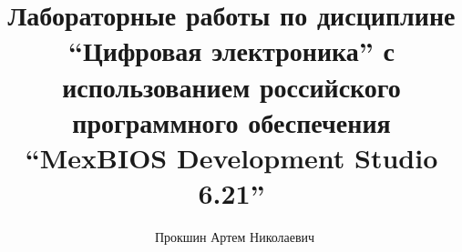 \newcommand{\itemi}{\item[\checkmark]}


\title{\small{ Лабораторные работы по дисциплине \enquote{Цифровая электроника} с использованием российского программного обеспечения
\enquote{MexBIOS Development Studio 6.21}}}
\author{\small{%
\emph{}~Прокшин Артем Николаевич}}



\vspace{30pt}%

\vspace{60pt}%

\AdvanceDate[0] %


\begin{frame}
\titlepage	
\end{frame}



